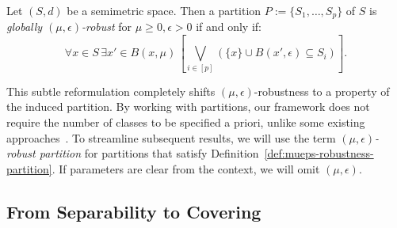 \begin{definition}
\label{def:mueps-robustness-partition}
Let $(S,d)$ be a semimetric space. Then a partition $P := \{S_1,\dots,S_p\}$ of $S$
is \emph{globally $(\mu, \epsilon)$-robust} for $\mu \geq 0, \epsilon > 0$ if and only if:
$$\forall x \in S\,\exists x' \in B(x,\mu) \,[\bigvee_{i \in [p]} (\{x\} \cup B(x', \epsilon) \subseteq S_i)].$$
\end{definition}
This subtle reformulation completely shifts $(\mu,\epsilon)$-robustness to a property of the induced partition. 
By working with partitions, our framework does not require the number of classes to be specified a priori, unlike some existing approaches~\cite{yang2024geometric}. To streamline subsequent results, we will use the term \emph{$(\mu,\epsilon)$-robust partition} for partitions that satisfy Definition~\ref{def:mueps-robustness-partition}. If parameters are clear from the context, we will omit $(\mu,\epsilon)$.

\subsection{From Separability to Covering}

